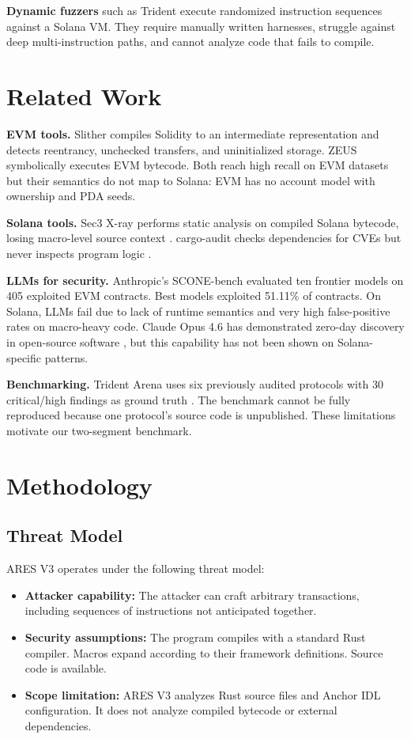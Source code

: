 \documentclass[conference]{IEEEtran}
\begin{document}
{\bf Dynamic fuzzers} such as Trident \cite{ackee2026trident} execute randomized instruction sequences against a Solana VM. They require manually written harnesses, struggle against deep multi-instruction paths, and cannot analyze code that fails to compile.

\section{Related Work}
\label{sec:related}

{\bf EVM tools.} Slither \cite{feist2019slither} compiles Solidity to an intermediate representation and detects reentrancy, unchecked transfers, and uninitialized storage. ZEUS \cite{kalra2018zeus} symbolically executes EVM bytecode. Both reach high recall on EVM datasets but their semantics do not map to Solana: EVM has no account model with ownership and PDA seeds.

{\bf Solana tools.} Sec3 X-ray performs static analysis on compiled Solana bytecode, losing macro-level source context \cite{sec32026xray}. cargo-audit checks dependencies for CVEs but never inspects program logic \cite{trailofbits2026cargo_audit}.

{\bf LLMs for security.} Anthropic's SCONE-bench \cite{anthropic2025sconebench} evaluated ten frontier models on 405 exploited EVM contracts. Best models exploited 51.11\% of contracts. On Solana, LLMs fail due to lack of runtime semantics and very high false-positive rates on macro-heavy code. Claude Opus 4.6 has demonstrated zero-day discovery in open-source software \cite{anthropic2026zerodays}, but this capability has not been shown on Solana-specific patterns.

{\bf Benchmarking.} Trident Arena uses six previously audited protocols with 30 critical/high findings as ground truth \cite{ackee2026trident_arena}. The benchmark cannot be fully reproduced because one protocol'{}s source code is unpublished. These limitations motivate our two-segment benchmark.

\section{Methodology}
\label{sec:method}

\subsection{Threat Model}

ARES V3 operates under the following threat model:
\begin{itemize}
  \item {\bf Attacker capability:} The attacker can craft arbitrary transactions, including sequences of instructions not anticipated together.
  \item {\bf Security assumptions:} The program compiles with a standard Rust compiler. Macros expand according to their framework definitions. Source code is available.
  \item {\bf Scope limitation:} ARES V3 analyzes Rust source files and Anchor IDL configuration. It does not analyze compiled bytecode or external dependencies.
\end{itemize}
\end{document}
